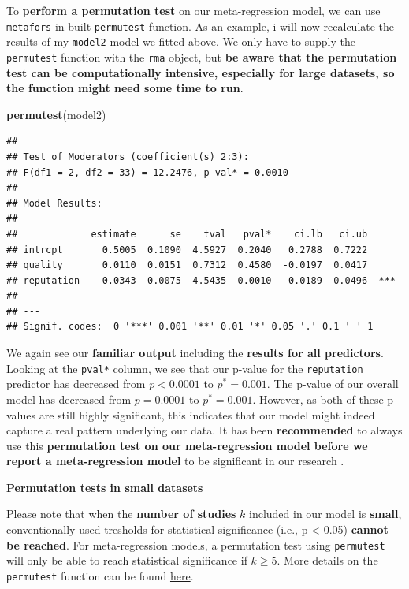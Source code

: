 \documentclass[]{book}
\newenvironment{Shaded}{\begin{snugshade}}{\end{snugshade}}
\newcommand{\KeywordTok}[1]{\textcolor[rgb]{0.13,0.29,0.53}{\textbf{#1}}}
\newcommand{\NormalTok}[1]{#1}
\begin{document}
To \textbf{perform a permutation test} on our meta-regression model, we can use \texttt{metafors} in-built \texttt{permutest} function. As an example, i will now recalculate the results of my \texttt{model2} model we fitted above. We only have to supply the \texttt{permutest} function with the \texttt{rma} object, but \textbf{be aware that the permutation test can be computationally intensive, especially for large datasets, so the function might need some time to run}.

\begin{Shaded}
\begin{Highlighting}[]
\KeywordTok{permutest}\NormalTok{(model2)}
\end{Highlighting}
\end{Shaded}

\begin{verbatim}
## 
## Test of Moderators (coefficient(s) 2:3): 
## F(df1 = 2, df2 = 33) = 12.2476, p-val* = 0.0010
## 
## Model Results:
## 
##             estimate      se    tval   pval*    ci.lb   ci.ub     
## intrcpt       0.5005  0.1090  4.5927  0.2040   0.2788  0.7222     
## quality       0.0110  0.0151  0.7312  0.4580  -0.0197  0.0417     
## reputation    0.0343  0.0075  4.5435  0.0010   0.0189  0.0496  ***
## 
## ---
## Signif. codes:  0 '***' 0.001 '**' 0.01 '*' 0.05 '.' 0.1 ' ' 1
\end{verbatim}

We again see our \textbf{familiar output} including the \textbf{results for all predictors}. Looking at the \texttt{pval*} column, we see that our p-value for the \texttt{reputation} predictor has decreased from \(p<0.0001\) to \(p^*=0.001\). The p-value of our overall model has decreased from \(p=0.0001\) to \(p^*=0.001\). However, as both of these p-values are still highly significant, this indicates that our model might indeed capture a real pattern underlying our data. It has been \textbf{recommended} to always use this \textbf{permutation test on our meta-regression model before we report a meta-regression model} to be significant in our research \citep{higgins2004controlling}.

\begin{rmdachtung}
\textbf{Permutation tests in small datasets}

Please note that when the \textbf{number of studies} \(k\) included in
our model is \textbf{small}, conventionally used tresholds for
statistical significance (i.e., p \textless{} 0.05) \textbf{cannot be
reached}. For meta-regression models, a permutation test using
\texttt{permutest} will only be able to reach statistical significance
if \(k \geq 5\). More details on the \texttt{permutest} function can be
found
\href{https://www.rdocumentation.org/packages/metafor/versions/1.9-9/topics/permutest}{here}.
\end{rmdachtung}
\end{document}
